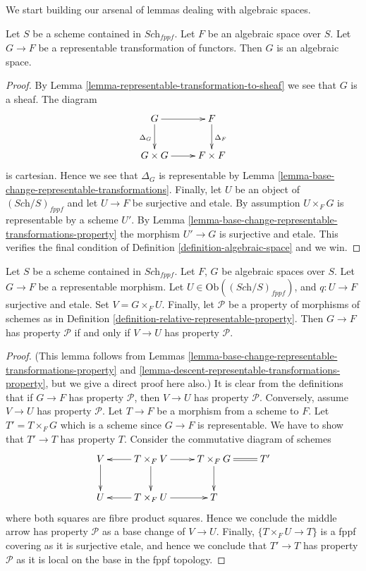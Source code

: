 \noindent
We start building our arsenal of lemmas dealing with algebraic spaces.

\begin{lemma}
\label{lemma-representable-over-space}
Let $S$ be a scheme contained in $\textit{Sch}_{fppf}$.
Let $F$ be an algebraic space over $S$.
Let $G \to F$ be a representable transformation of functors.
Then $G$ is an algebraic space.
\end{lemma}

\begin{proof}
By Lemma \ref{lemma-representable-transformation-to-sheaf}
we see that $G$ is a sheaf. The diagram
$$
\xymatrix{
G \ar[r] \ar[d]_{\Delta_G} & F \ar[d]^{\Delta_F} \\
G \times G \ar[r] & F \times F
}
$$
is cartesian. Hence we see that $\Delta_G$ is representable by
Lemma \ref{lemma-base-change-representable-transformations}.
Finally, let $U$ be an object of $(\textit{Sch}/S)_{fppf}$
and let $U \to F$ be surjective and etale. By assumption
$U \times_F G$ is representable by a scheme $U'$. By
Lemma \ref{lemma-base-change-representable-transformations-property}
the morphism $U' \to G$ is surjective and etale. This verifies
the final condition of Definition \ref{definition-algebraic-space} and we win.
\end{proof}

\begin{lemma}
\label{lemma-representable-morphisms-spaces-property}
Let $S$ be a scheme contained in $\textit{Sch}_{fppf}$.
Let $F$, $G$ be algebraic spaces over $S$.
Let $G \to F$ be a representable morphism.
Let $U \in \text{Ob}((\textit{Sch}/S)_{fppf})$, and $q : U \to F$
surjective and etale. Set $V = G \times_F U$.
Finally, let $\mathcal{P}$ be a property of morphisms
of schemes as in Definition \ref{definition-relative-representable-property}.
Then $G \to F$ has property $\mathcal{P}$ if and only if
$V \to U$ has property $\mathcal{P}$.
\end{lemma}

\begin{proof}
(This lemma follows from
Lemmas \ref{lemma-base-change-representable-transformations-property} and
\ref{lemma-descent-representable-transformations-property},
but we give a direct proof here also.)
It is clear from the definitions that if $G \to F$ has property
$\mathcal{P}$, then $V \to U$ has property $\mathcal{P}$.
Conversely, assume $V \to U$ has property $\mathcal{P}$.
Let $T \to F$ be a morphism from a scheme to $F$.
Let $T' = T \times_F G$ which is a scheme since $G \to F$ is
representable. We have to show that $T' \to T$ has property $T$.
Consider the commutative diagram of schemes
$$
\xymatrix{
V \ar[d] & T \times_F V \ar[d] \ar[l] \ar[r] &
T \times_F G \ar[d] & \ar@{=}[l] T' \\
U & T \times_F U \ar[l] \ar[r] & T
}
$$
where both squares are fibre product squares. Hence we conclude
the middle arrow has property $\mathcal{P}$ as a base change
of $V \to U$. Finally, $\{T \times_F U \to T\}$ is a fppf covering
as it is surjective etale, and hence we conclude that
$T' \to T$ has property $\mathcal{P}$ as it is local on the
base in the fppf topology.
\end{proof}


